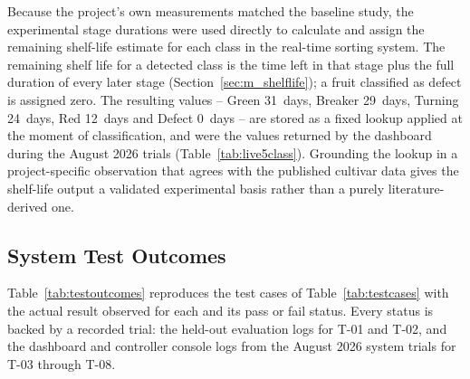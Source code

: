 Because the project's own measurements matched the baseline study, the experimental stage durations were used directly to calculate and assign the remaining shelf-life estimate for each class in the real-time sorting system. The remaining shelf life for a detected class is the time left in that stage plus the full duration of every later stage (Section~\ref{sec:m_shelflife}); a fruit classified as defect is assigned zero. The resulting values -- Green 31~days, Breaker 29~days, Turning 24~days, Red 12~days and Defect 0~days -- are stored as a fixed lookup applied at the moment of classification, and were the values returned by the dashboard during the August 2026 trials (Table~\ref{tab:live5class}). Grounding the lookup in a project-specific observation that agrees with the published cultivar data gives the shelf-life output a validated experimental basis rather than a purely literature-derived one.

\subsection{System Test Outcomes}
\label{sec:r_tests}

Table~\ref{tab:testoutcomes} reproduces the test cases of Table~\ref{tab:testcases} with the actual result observed for each and its pass or fail status. Every status is backed by a recorded trial: the held-out evaluation logs for T-01 and T-02, and the dashboard and controller console logs from the August 2026 system trials for T-03 through T-08.

